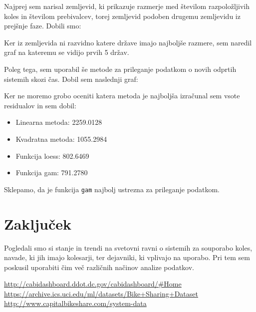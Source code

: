 \documentclass[11pt,a4paper]{article}
\begin{document}
  Najprej sem narisal zemljevid, ki prikazuje razmerje med številom razpoložljivih koles in številom prebivalcev, torej zemljevid podoben drugemu zemljevidu iz prejšnje faze. Dobili smo:
\newpage
\begin{figure}[t]
\end{figure}

\newpage

Ker iz zemljevida ni razvidno katere države imajo najboljše razmere, sem naredil graf na kateremu se vidijo prvih 5 držav. 

Poleg tega, sem uporabil še metode za prileganje podatkom o novih odprtih sistemih skozi čas. Dobil sem naslednji graf:
\begin{figure}[h]
\end{figure}

Ker ne moremo grobo oceniti katera metoda je najboljša izračunal sem vsote residualov in sem dobil:

\begin{itemize}
\item{Linearna metoda: 2259.0128}
\item{Kvadratna metoda: 1055.2984}
\item{Funkcija loess: 802.6469}
\item{Funkcija gam: 791.2780}
\end{itemize}

Sklepamo, da je funkcija \verb|gam| najbolj ustrezna za prileganje podatkom.


\newpage
\section{Zaključek}

Pogledali smo si stanje in trendi na svetovni ravni o sistemih za souporabo koles, navade, ki jih imajo kolesarji, ter dejavniki, ki vplivajo na uporabo. Pri tem sem poskusil uporabiti čim več različnih načinov analize podatkov.


\newpage
\begin{thebibliography}{3}
  \url{http://cabidashboard.ddot.dc.gov/cabidashboard/#Home}\\
  \url{https://archive.ics.uci.edu/ml/datasets/Bike+Sharing+Dataset}\\
  \url{http://www.capitalbikeshare.com/system-data}\\

\end{thebibliography}
\end{document}
